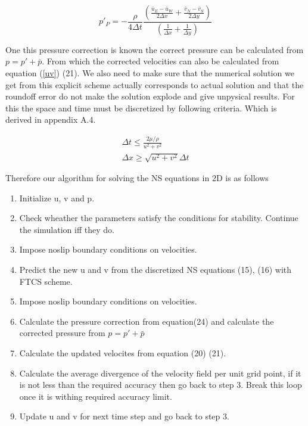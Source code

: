 \documentclass{article}		%
\begin{document}
 \begin{equation}
  p'_P  =  - \frac{\rho}{4\Delta t} \frac{\left( \frac{\bar{u}_E -\bar{u}_W  }{2 \Delta x} +  \frac{\bar{v}_N -\bar{v}_S  }{2 \Delta y} \right) }{ \left(\frac{1}{\Delta x} + \frac{1}{\Delta y}\right)} 
 \end{equation}

 One this pressure correction is known the correct pressure can be calculated from $p = p' + \bar{p}$. From which the corrected velocities can also be calculated from equation (\ref{uv}) (21). 
       We also need to make sure that the numerical solution we get from this explicit scheme actually corresponds to actual solution and that the roundoff error do not make the solution explode and give unpysical results. For this the space and time must be discretized by following criteria. Which is derived in appendix A.4.   
       
       \begin{eqnarray}
       \Delta t  \le \frac{2\mu / \rho }{u^2 + v^2}\\
       \Delta x \ge \sqrt{u^2 + v^2} \Delta t
       \end{eqnarray}
       
 
 \newpage
 
 	Therefore our algorithm for solving the NS equations in 2D is as follows
 	
 \begin{enumerate}
 	\item Initialize u, v and p.
 	\item Check wheather the parameters satisfy the conditions for stability. Continue the simulation iff they do.
 	\item Impose noslip boundary conditions on velocities.
 	\item Predict the new u and v from the discretized NS equations (15), (16) with FTCS scheme. 
 	\item Impose noslip boundary conditions on velocities.
 	\item Calculate the pressure correction from equation(24) and calculate the corrected pressure from $p = p' + \bar{p}$ 
 	\item Calculate the updated velocites from equation (20) (21). 
 	\item Calculate the average divergence of the velocity field per unit grid point, if it is not less than the required accuracy then go back to step 3. Break this loop once it is withing required accuracy limit.
 	\item Update u and v for next time step and go back to step 3.
 	
 \end{enumerate}	 	
\end{document}

